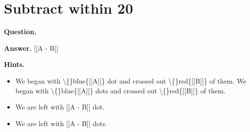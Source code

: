 \documentclass{article}
\begin{document}
\section*{Subtract within 20}
\textbf{Question.} 

\textbf{Answer.} [[A - B]]

\textbf{Hints.}
\begin{itemize}
  \item We began with \textbackslash\{\}blue\{[[A]]\} dot and crossed out \textbackslash\{\}red\{[[B]]\} of them.
                        We began with \textbackslash\{\}blue\{[[A]]\} dots and crossed out \textbackslash\{\}red\{[[B]]\} of them.
  \item We are left with [[A - B]] dot.
  \item We are left with [[A - B]] dots.
\end{itemize}
\end{document}
